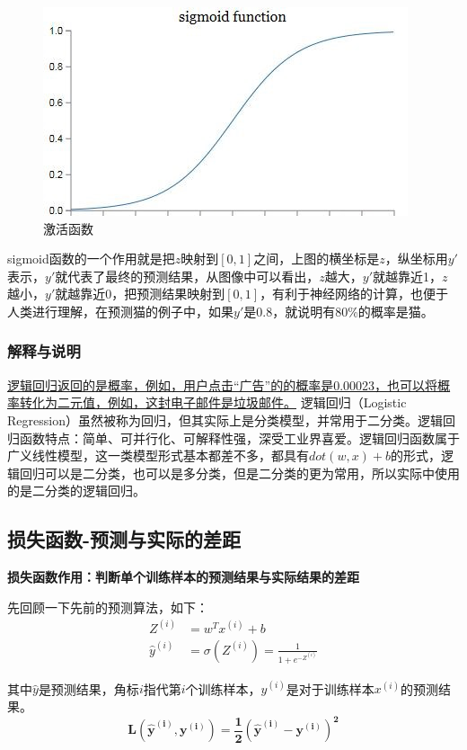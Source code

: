 \begin{figure}[htb]
	\centering
	\includegraphics[width=0.7\linewidth]{pictures/激活函数/sigmoid}
	\caption{激活函数}
	\label{fig:sigmoid}
\end{figure}

sigmoid函数的一个作用就是把$z$映射到$[0, 1]$之间，上图的横坐标是$z$，纵坐标用$y'$表示，$y'$就代表了最终的预测结果，从图像中可以看出，$z$越大，$y'$就越靠近1，$z$越小，$y'$就越靠近0，把预测结果映射到$[0, 1]$，有利于神经网络的计算，也便于人类进行理解，在预测猫的例子中，如果$y'$是0.8，就说明有80\%的概率是猫。

\subsubsection{解释与说明}
\underline{逻辑回归返回的是概率，例如，用户点击“广告”的的概率是0.00023，也可以将概率转化为二元值，例如，这封电子邮件是垃圾邮件。}
逻辑回归（Logistic Regression）虽然被称为回归，但其实际上是分类模型，并常用于二分类。逻辑回归函数特点：简单、可并行化、可解释性强，深受工业界喜爱。逻辑回归函数属于广义线性模型，这一类模型形式基本都差不多，都具有$dot(w, x) + b$的形式，逻辑回归可以是二分类，也可以是多分类，但是二分类的更为常用，所以实际中使用的是二分类的逻辑回归。

\subsection{损失函数-预测与实际的差距}
\textbf{损失函数作用：判断单个训练样本的预测结果与实际结果的差距}

先回顾一下先前的预测算法，如下：	
\begin{align*}
	Z^{(i)} &= w^Tx^{(i)} + b \\
	\hat{y}^{(i)} &= \sigma (Z^{(i)}) = \frac{1}{1 + e^{-Z^{(i)}}}
\end{align*}

其中$\hat{y}$是预测结果，角标$i$指代第$i$个训练样本，$\hat{y}^{(i)}$是对于训练样本$x^{(i)}$的预测结果。
$$\bm{L(\hat{y}^{(i)}, y^{(i)}) = \frac{1}{2}(\hat{y}^{(i)} - y^{(i)})^2}$$

